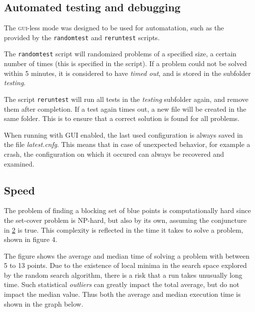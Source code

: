 \documentclass[a4paper,12pt]{article}
\begin{document}
\subsection{Automated testing and debugging}
The \textsc{gui}-less mode was designed to be used for automatation, such as the provided by the \texttt{randomtest} and \texttt{reruntest} scripts.

The \texttt{randomtest} script will randomized problems of a specified size, a certain number of times (this is specified in the script). If a problem could not be solved within 5 minutes, it is considered to have \emph{timed out}, and is stored in the subfolder \emph{testing}.

The script \texttt{reruntest} will run all tests in the \emph{testing} subfolder again, and remove them after completion. If a test again times out, a new file will be created in the same folder. This is to ensure that a correct solution is found for all problems.

When running with \textsc{GUI} enabled, the last used configuration is always saved in the file \emph{latest.cnfg}. This means that in case of unexpected behavior, for example a crash, the configuration on which it occured can always be recovered and examined.

\subsection{Speed}
\label{speed}
The problem of finding a blocking set of blue points is computationally hard since the set-cover problem is NP-hard, but also by its own, assuming the conjuncture in \hyperref[ref:blocking]{2} is true. This complexity is reflected in the time it takes to solve a problem, shown in figure 4.

The figure shows the average and median time of solving a problem with between 5 to 13 points. Due to the existence of local minima in the search space explored by the random search algorithm, there is a risk that a run takes unusually long time. Such statistical \emph{outliers} can greatly impact the total average, but do not impact the median value. Thus both the average and median execution time is shown in the graph below.
\end{document}
